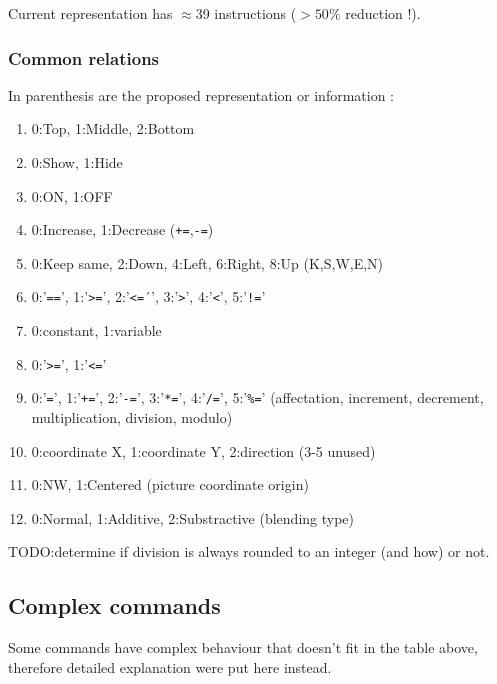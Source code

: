\documentclass[11pt]{article}
\begin{document}
Current representation has $\approx$39 instructions ($>50\%$ reduction !).


\newpage
\subsubsection{Common relations}

In parenthesis are the proposed representation or information :
\begin{enumerate}
	\item 0:Top, 1:Middle, 2:Bottom
	\item 0:Show, 1:Hide
	\item 0:ON, 1:OFF
	\item 0:Increase, 1:Decrease (\verb|+=|,\verb|-=|)
	\item 0:Keep same, 2:Down, 4:Left, 6:Right, 8:Up (K,S,W,E,N)
	\item 0:'\verb|==|', 1:'\verb|>=|', 2:'\verb|<=|´', 3:'\verb|>|', 4:'\verb|<|', 5:'\verb|!=|'
	\item 0:constant, 1:variable
	\item 0:'\verb|>=|', 1:'\verb|<=|'
	\item 0:'\verb|=|', 1:'\verb|+=|', 2:'\verb|-=|', 3:'\verb|*=|', 4:'\verb|/=|', 5:'\verb|%=|' (affectation, increment, decrement, multiplication, division, modulo)
	\item 0:coordinate X, 1:coordinate Y, 2:direction (3-5 unused)
	\item 0:NW, 1:Centered (picture coordinate origin)
	\item 0:Normal, 1:Additive, 2:Substractive (blending type)
\end{enumerate}

TODO:determine if division is always rounded to an integer (and how) or not.


\subsection{Complex commands}

Some commands have complex behaviour that doesn't fit in the table above, therefore detailed explanation were put here instead.
\end{document}

